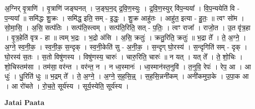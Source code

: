 \documentclass[17pt]{extarticle}
\begin{document}
अ॒ग्निर् वृ॒त्राणि॑ । वृ॒त्राणि॑ जङ्घनत् । ज॒ङ्घ॒न॒द् द्र॒वि॒ण॒स्युः । द्र॒वि॒ण॒स्युर् वि॑प॒न्यया᳚ । वि॒प॒न्ययेति॑ वि - प॒न्यया᳚ ॥ समि॑द्धः शु॒क्रः । समि॑द्ध॒ इति॒ सम् - इ॒द्धः॒ । शु॒क्र आहु॑तः । आहु॑त॒ इत्या - हु॒तः॒ ॥ त्वꣳ सो॑म । सो॒मा॒सि॒ । अ॒सि॒ सत्प॑तिः । सत्प॑ति॒स्त्वम् । सत्प॑ति॒रिति॒ सत् - प॒तिः॒ । त्वꣳ राजा᳚ । राजो॒त । उ॒त वृ॑त्र॒हा । वृ॒त्र॒हेति॑ वृत्र - हा ॥ त्वम् भ॒द्रः । भ॒द्रो अ॑सि । अ॒सि॒ क्रतुः॑ । क्रतु॒रिति॒ क्रतुः॑ ॥ भ॒द्रा ते᳚ । ते॒ अ॒ग्ने॒ । अ॒ग्ने॒ स्व॒नी॒क॒ । स्व॒नी॒क॒ स॒न्दृक् । स्व॒नी॒केति॑ सु - अ॒नी॒क॒ । स॒न्दृग् घो॒रस्य॑ । स॒न्दृगिति॑ सम् - दृक् । घो॒रस्य॑ स॒तः । स॒तो विषु॑णस्य । विषु॑णस्य॒ चारुः॑ । चारु॒रिति॒ चारुः॑ ॥ न यत् । यत् ते᳚ । ते॒ शो॒चिः । शो॒चिस्तम॑सा । तम॑सा॒ वर॑न्त । वर॑न्त॒ न । न ध्व॒स्मानः॑ । ध्व॒स्मान॑स्त॒नुवि॑ । त॒नुवि॒ रेपः॑ । रेप॒ आ । आ धुः॑ । धु॒रिति॑ धुः ॥ भ॒द्रम् ते᳚ । ते॒ अ॒ग्ने॒ । अ॒ग्ने॒ स॒ह॒सि॒न्न्॒ । स॒ह॒सि॒न्ननी॑कम् । अनी॑कमुपा॒के । उ॒पा॒क आ । आ रो॑चते । रो॒च॒ते॒ सूर्य॑स्य । सूर्य॒स्येति॒ सूर्य॑स्य । \newline

\textbf{Jatai Paata} \newline
\end{document}
